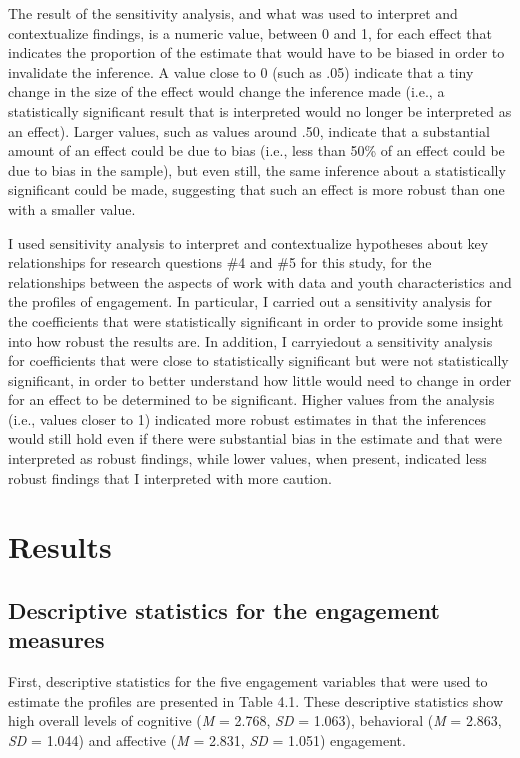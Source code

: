 \documentclass[]{msu-thesis}
\theoremstyle{definition}
\theoremstyle{definition}
\theoremstyle{definition}
\theoremstyle{remark}
\begin{document}
The result of the sensitivity analysis, and what was used to interpret
and contextualize findings, is a numeric value, between 0 and 1, for
each effect that indicates the proportion of the estimate that would
have to be biased in order to invalidate the inference. A value close to
0 (such as .05) indicate that a tiny change in the size of the effect
would change the inference made (i.e., a statistically significant
result that is interpreted would no longer be interpreted as an effect).
Larger values, such as values around .50, indicate that a substantial
amount of an effect could be due to bias (i.e., less than 50\% of an
effect could be due to bias in the sample), but even still, the same
inference about a statistically significant could be made, suggesting
that such an effect is more robust than one with a smaller value.

I used sensitivity analysis to interpret and contextualize hypotheses
about key relationships for research questions \#4 and \#5 for this
study, for the relationships between the aspects of work with data and
youth characteristics and the profiles of engagement. In particular, I
carried out a sensitivity analysis for the coefficients that were
statistically significant in order to provide some insight into how
robust the results are. In addition, I carryiedout a sensitivity
analysis for coefficients that were close to statistically significant
but were not statistically significant, in order to better understand
how little would need to change in order for an effect to be determined
to be significant. Higher values from the analysis (i.e., values closer
to 1) indicated more robust estimates in that the inferences would still
hold even if there were substantial bias in the estimate and that were
interpreted as robust findings, while lower values, when present,
indicated less robust findings that I interpreted with more caution.

\chapter{Results}\label{results}

\section{Descriptive statistics for the engagement
measures}\label{descriptive-statistics-for-the-engagement-measures}

First, descriptive statistics for the five engagement variables that
were used to estimate the profiles are presented in Table 4.1. These
descriptive statistics show high overall levels of cognitive (\emph{M} =
2.768, \emph{SD} = 1.063), behavioral (\emph{M} = 2.863, \emph{SD} =
1.044) and affective (\emph{M} = 2.831, \emph{SD} = 1.051) engagement.
\end{document}
